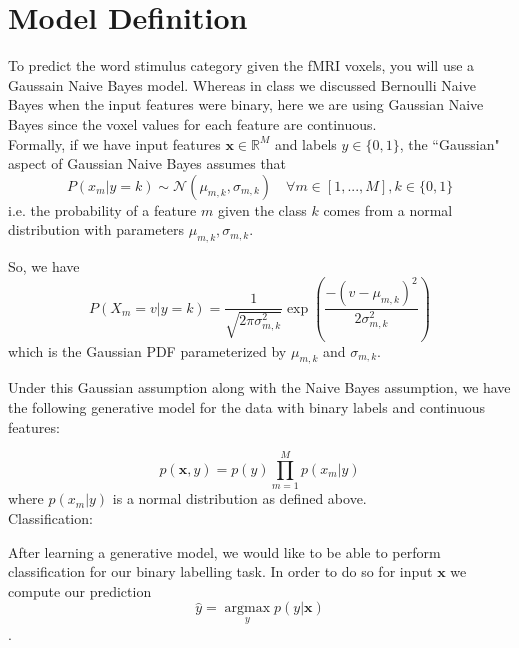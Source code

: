 \documentclass[11pt,addpoints,answers]{exam}
\newcommand \argmax {\operatorname*{argmax}}
\begin{document}
 \vspace{5mm}
\section{Model Definition}
\label{Model Definition}

To predict the word stimulus category given the fMRI voxels, you will use a Gaussain Naive Bayes model. Whereas in class we discussed Bernoulli Naive Bayes when the input features were binary, here we are using Gaussian Naive Bayes since the voxel values for each feature are continuous. \\

Formally, if we have input features $\mathbf{x} \in \mathbb{R}^M$ and labels $y \in \{0,1\}$, the ``Gaussian" aspect of Gaussian Naive Bayes assumes that $$P(x_m |y=k) \sim \mathcal{N}(\mu_{m,k}, \sigma_{m,k}) \quad \forall m \in [1,...,M], k \in \{0,1\}$$ i.e. the probability of a feature $m$ given the class $k$ comes from a normal distribution with parameters $\mu_{m,k}, \sigma_{m,k}$.

So, we have $$P(X_m = v | y = k) = \frac{1}{\sqrt{2\pi\sigma_{m,k}^2}} \exp{(\frac{-(v-\mu_{m,k})^2}{2\sigma_{m,k}^2})}$$ which is the Gaussian PDF parameterized by $\mu_{m,k}$ and $\sigma_{m,k}$.

Under this Gaussian assumption along with the Naive Bayes assumption, we have the following generative model for the data with binary labels and continuous features: 

$$p(\mathbf{x},y) = p(y)\prod_{m=1}^{M} p(x_m|y)$$ where $p(x_m|y)$ is a normal distribution as defined above. \\

Classification:

After learning a generative model, we would like to be able to perform classification for our binary labelling task. In order to do so for input $\mathbf{x}$ we compute our prediction $$\hat{y} = \argmax_y p(y|\mathbf{x})$$. \\




\end{document}

